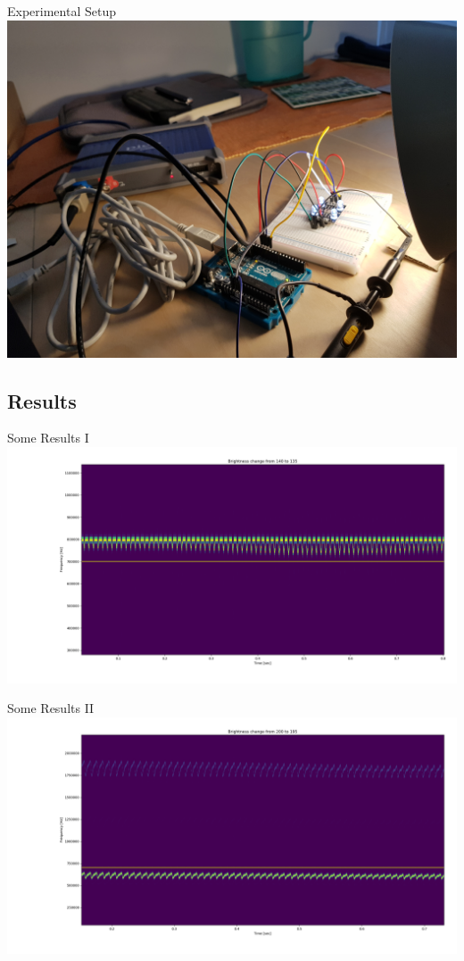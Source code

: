 \documentclass[11pt,t,usepdftitle=false,aspectratio=169]{beamer}
\begin{document}
\begin{frame}{Experimental Setup}
	\includegraphics[trim={0 0 0 12cm},clip]{../experiment/project_setup/20180510_123244.jpg}
\end{frame}

\subsection{Results}%
\label{sub:results}

\begin{frame}{Some Results I} 
	\includegraphics[width=\textwidth]{../experiment/140-135-2.png}
\end{frame}

\begin{frame}{Some Results II}
	\includegraphics[width=\textwidth]{../experiment/200-195-10Mhz.png}
\end{frame}
\end{document}
